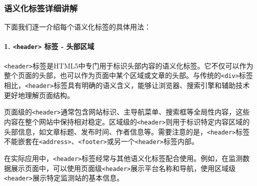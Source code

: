 \subsubsection{语义化标签详细讲解}\label{ux8bedux4e49ux5316ux6807ux7b7eux8be6ux7ec6ux8bb2ux89e3}

下面我们逐一介绍每个语义化标签的具体用法：

\paragraph{\texorpdfstring{1. \texttt{\textless{}header\textgreater{}} 标签 - 头部区域}{1. \textless header\textgreater{} 标签 - 头部区域}}\label{header-ux6807ux7b7e---ux5934ux90e8ux533aux57df}

\texttt{\textless{}header\textgreater{}}标签是HTML5中专门用于标识头部内容的语义化标签。它不仅可以作为整个页面的头部，也可以作为页面中某个区域或文章的头部。与传统的\texttt{\textless{}div\textgreater{}}标签相比，\texttt{\textless{}header\textgreater{}}标签具有明确的语义含义，能够让浏览器、搜索引擎和辅助技术更好地理解页面结构。

页面级的\texttt{\textless{}header\textgreater{}}通常包含网站标识、主导航菜单、搜索框等全局性内容，这些内容在整个网站中保持相对稳定。区域级的\texttt{\textless{}header\textgreater{}}则用于标识特定内容区域的头部信息，如文章标题、发布时间、作者信息等。需要注意的是，\texttt{\textless{}header\textgreater{}}标签不能嵌套在\texttt{\textless{}address\textgreater{}}、\texttt{\textless{}footer\textgreater{}}或另一个\texttt{\textless{}header\textgreater{}}标签内部。

在实际应用中，\texttt{\textless{}header\textgreater{}}标签经常与其他语义化标签配合使用。例如，在监测数据展示页面中，可以使用页面级\texttt{\textless{}header\textgreater{}}展示平台名称和导航，使用区域级\texttt{\textless{}header\textgreater{}}展示特定监测站的基本信息。

